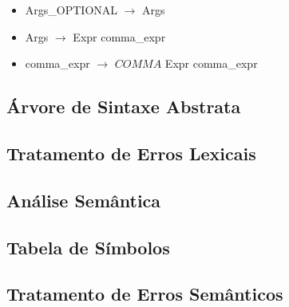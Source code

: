 \documentclass[12pt]{article}
\begin{document}
\begin{itemize}
  \item[] Args\_OPTIONAL $\longrightarrow$ Args
  
  \item[] Args $\longrightarrow$ Expr comma\_expr
  
  \item[] comma\_expr $\longrightarrow$ $COMMA$ Expr comma\_expr               
  
  
\end{itemize}


\subsection{Árvore de Sintaxe Abstrata}

\subsection{Tratamento de Erros Lexicais}

\subsection{Análise Semântica}

\subsection{Tabela de Símbolos}

\subsection{Tratamento de Erros Semânticos}









	
	
\end{document}

